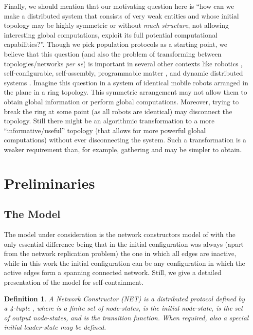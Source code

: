 \documentclass[preprint]{elsarticle}
\newtheorem{definition}{Definition}
\begin{document}
Finally, we should mention that our motivating question here is ``how can we make a distributed system that consists of very weak entities and whose initial topology may be highly symmetric or without \emph{much structure}, not allowing interesting global computations, exploit its full potential computational capabilities?''. Though we pick population protocols as a starting point, we believe that this question (and also the problem of transforming between topologies/networks \emph{per se}) is important in several other contexts like robotics \cite{SY99,DFSY15,CKLL09,FYKY12}, self-configurable, self-assembly, programmable matter \cite{Mi15,DDGRS14}, and dynamic distributed systems \cite{OW05,KLO10,MCS14,MCS13b}. Imagine this question in a system of identical mobile robots arranged in the plane in a ring topology. This symmetric arrangement may not allow them to obtain global information or perform global computations. Moreover, trying to break the ring at some point (as all robots are identical) may disconnect the topology. Still there might be an algorithmic transformation to a more ``informative/useful'' topology (that allows for more powerful global computations) without ever disconnecting the system. Such a transformation is a weaker requirement than, for example, gathering \cite{CFPS03} and may be simpler to obtain.


\section{Preliminaries}
\label{sec:prel}

\subsection{The Model}
\label{subsec:model}

The model under consideration is the network constructors model of \cite{MS14} with the only essential difference being that in \cite{MS14} the initial configuration was always (apart from the network replication problem) the one in which all edges are inactive, while in this work the initial configuration can be any configuration in which the active edges form a spanning connected network. Still, we give a detailed presentation of the model for self-containment.

\begin{definition}
A \emph{Network Constructor} (NET) is a distributed protocol defined by a 4-tuple , where
 is a finite set of \emph{node-states},  is the \emph{initial node-state},  is the set of \emph{output node-states}, and  is the \emph{transition function}. When required, also a special \emph{initial leader-state}  may be defined.
\end{definition}
\end{document}

